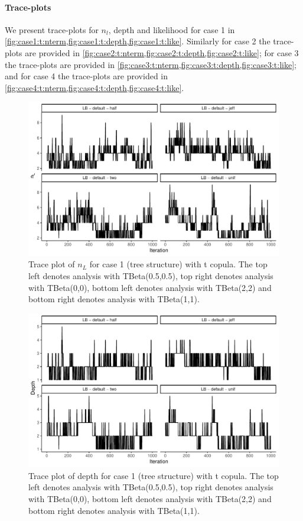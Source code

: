 \documentclass{amsart}
\begin{document}
\paragraph{Trace-plots} We present trace-plots for $n_l$, depth and likelihood for case 1 in \cref{fig:case1:t:nterm,fig:case1:t:depth,fig:case1:t:like}. Similarly for case 2 the trace-plots are provided in \cref{fig:case2:t:nterm,fig:case2:t:depth,fig:case2:t:like}; for case 3 the trace-plots are provided in \cref{fig:case3:t:nterm,fig:case3:t:depth,fig:case3:t:like}; and for case 4 the trace-plots are provided in \cref{fig:case4:t:nterm,fig:case4:t:depth,fig:case4:t:like}.


\begin{figure}
	\centering
	\includegraphics[width = 0.75\linewidth]{trace_case1_t_nterm.pdf}
	\caption{Trace plot of $n_L$ for case 1 (tree structure) with t copula. The top left denotes analysis with TBeta(0.5,0.5), top right denotes analysis with TBeta(0,0), bottom left denotes analysis with TBeta(2,2) and bottom right denotes analysis with TBeta(1,1).}
	\label{fig:case1:t:nterm}
\end{figure}

\begin{figure}
	\centering
	\includegraphics[width = 0.75\linewidth]{trace_case1_t_depth.pdf}
	\caption{Trace plot of depth for case 1 (tree structure) with t copula. The top left denotes analysis with TBeta(0.5,0.5), top right denotes analysis with TBeta(0,0), bottom left denotes analysis with TBeta(2,2) and bottom right denotes analysis with TBeta(1,1).}
	\label{fig:case1:t:depth}
\end{figure}
\end{document}
